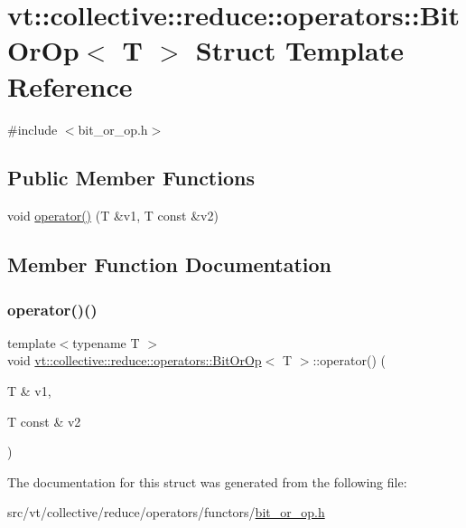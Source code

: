 \hypertarget{structvt_1_1collective_1_1reduce_1_1operators_1_1_bit_or_op}{}\section{vt\+:\+:collective\+:\+:reduce\+:\+:operators\+:\+:Bit\+Or\+Op$<$ T $>$ Struct Template Reference}
\label{structvt_1_1collective_1_1reduce_1_1operators_1_1_bit_or_op}


{\ttfamily \#include $<$bit\+\_\+or\+\_\+op.\+h$>$}

\subsection*{Public Member Functions}
\begin{DoxyCompactItemize}
\item 
void \hyperlink{structvt_1_1collective_1_1reduce_1_1operators_1_1_bit_or_op_a1a21e45f039a90582c71691ef219bf09}{operator()} (T \&v1, T const \&v2)
\end{DoxyCompactItemize}


\subsection{Member Function Documentation}
\mbox{\label{structvt_1_1collective_1_1reduce_1_1operators_1_1_bit_or_op_a1a21e45f039a90582c71691ef219bf09}} 
\subsubsection{\texorpdfstring{operator()()}{operator()()}}
{\footnotesize\ttfamily template$<$typename T $>$ \\
void \hyperlink{structvt_1_1collective_1_1reduce_1_1operators_1_1_bit_or_op}{vt\+::collective\+::reduce\+::operators\+::\+Bit\+Or\+Op}$<$ T $>$\+::operator() (\begin{DoxyParamCaption}\item[{T \&}]{v1,  }\item[{T const \&}]{v2 }\end{DoxyParamCaption})\hspace{0.3cm}{\ttfamily [inline]}}



The documentation for this struct was generated from the following file\+:\begin{DoxyCompactItemize}
\item 
src/vt/collective/reduce/operators/functors/\hyperlink{bit__or__op_8h}{bit\+\_\+or\+\_\+op.\+h}\end{DoxyCompactItemize}
